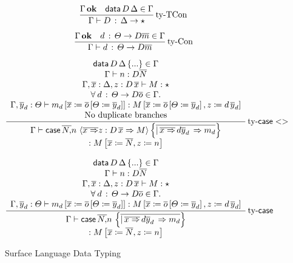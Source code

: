 \begin{figure}
\[
\frac{\Gamma\,\mathbf{ok}\quad\mathsf{data}\,D\,\Delta\in\Gamma}{\Gamma\vdash D\,:\,\Delta\rightarrow\star}\operatorname{ty-TCon}
\]

\[
\frac{\Gamma\,\mathbf{ok}\quad d\,:\,\varTheta\rightarrow D\overline{m}\in\Gamma}{\Gamma\vdash d\,:\,\varTheta\rightarrow D\overline{m}}\operatorname{ty-Con}
\]

\[
\frac{\begin{array}{c}
\mathsf{data}\,D\,\Delta\left\{ ...\right\} \in\Gamma\\
\Gamma\vdash n:D\overline{N}\\
\Gamma,\overline{x}:\Delta,z:D\,\overline{x}\vdash M:\star\\
\forall\:d\,:\,\varTheta\rightarrow D\overline{o}\in\Gamma.\\
\Gamma,\overline{y}_{d}:\varTheta\vdash m_{d}\left[\overline{x}\coloneqq\overline{o}\left[\varTheta\coloneqq\overline{y}_{d}\right]\right]:M\left[\overline{x}\coloneqq\overline{o}\left[\varTheta\coloneqq\overline{y}_{d}\right],z\coloneqq d\,\overline{y}_{d}\right]\\
\mathrm{No\ duplicate\ branches}
\end{array}}{\begin{array}{c}
\Gamma\vdash\mathsf{case}\,\overline{N,}n\,\left\langle \overline{x\Rightarrow}z:D\,\overline{x}\Rightarrow M\right\rangle \left\{ \overline{|\,\overline{x\Rightarrow}\,d\overline{y}_{d}\,\Rightarrow m_{d}}\right\} \\
:M\left[\overline{x}\coloneqq\overline{N},z\coloneqq n\right]
\end{array}
}\operatorname{ty-\mathsf{case}{}<>} 
\]

\[
\frac{\begin{array}{c}
\mathsf{data}\,D\,\Delta\left\{ ...\right\} \in\Gamma\\
\Gamma\vdash n:D\overline{N}\\
\Gamma,\overline{x}:\Delta,z:D\,\overline{x}\vdash M:\star\\
\forall\:d\,:\,\varTheta\rightarrow D\overline{o}\in\Gamma.\\
\Gamma,\overline{y}_{d}:\varTheta\vdash m_{d}\left[\overline{x}\coloneqq\overline{o}\left[\varTheta\coloneqq\overline{y}_{d}\right]\right]:M\left[\overline{x}\coloneqq\overline{o}\left[\varTheta\coloneqq\overline{y}_{d}\right],z\coloneqq d\,\overline{y}_{d}\right]
\end{array}}{\begin{array}{c}
\Gamma\vdash\mathsf{case}\,\overline{N,}n\,\left\{ \overline{|\,\overline{x\Rightarrow}\,d\overline{y}_{d}\,\Rightarrow m_{d}}\right\} \\
:M\left[\overline{x}\coloneqq\overline{N},z\coloneqq n\right]
\end{array}
}\operatorname{ty-\mathsf{case}{}}
\]

\caption{Surface Language Data Typing}
\label{fig:surface-data-ty}
\end{figure}

